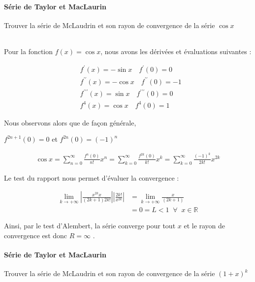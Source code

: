 \documentclass{report}
\begin{document}
\begin{multicols*}{2}
      \paragraph{Série de Taylor et MacLaurin}
      Trouver la série de McLaudrin et son rayon de convergence 
      de la série $\cos x$
      
      \mbox{}\\
      Pour la fonction $f(x) = \cos x $, nous avons les dérivées et 
      évaluations suivantes : 

      \begin{align*}
        &f^{\prime}(x) = -\sin x \quad f^{\prime}(0) = 0 \\ 
        &f^{\prime\prime}(x) = -\cos x \quad f^{\prime\prime}(0) = -1 \\ 
        &f^{\prime\prime\prime}(x) = \sin x \quad 
            f^{\prime\prime\prime}(0) = 0  \\ 
        &f^{4}(x) = \cos x \quad f^{4}(0) = 1 
      \end{align*} 

      Nous observons alors que de façon générale, 
      
      $f^{2n+1}(0) = 0$ et $f^{2n}(0) = (-1)^{n}$

      \begin{align*}
          \cos x = \sum_{n=0}^{\infty }\frac{f^{n}(0)}{n!}x^n  
          = 
          \sum_{k=0}^{\infty }\frac{f^{2k}(0)}{k!}x^{k} 
          = 
          \sum_{k=0}^{\infty }\frac{(-1)^k}{2k!}x^{2k} 
      \end{align*}

      Le test du rapport nous permet d'évaluer la convergence : 


      \begin{align*}
          \lim\limits_{k \to+\infty }  
              \left|
                  \frac{x^{2k}x}{(2k + 1)2k!} 
              \right|
              \left|
                  \frac{2k!}{x^{2k}} 
              \right|
          &= 
          \lim\limits_{k \to+\infty }\frac{x}{(2k + 1)}   
          \\ 
          &= 0 = L < 1 \;\; \forall \;\; x \in \mathbb{R}
      \end{align*}      

      Ainsi, par le test d'Alembert, la série converge 
      pour tout $x$ et le rayon de convergence est donc 
      $R = \infty$ . 


      \paragraph{Série de Taylor et MacLaurin}
      Trouver la série de McLaudrin et son rayon de convergence 
      de la série $(1 + x)^k$
      

\end{multicols*}
\end{document}
